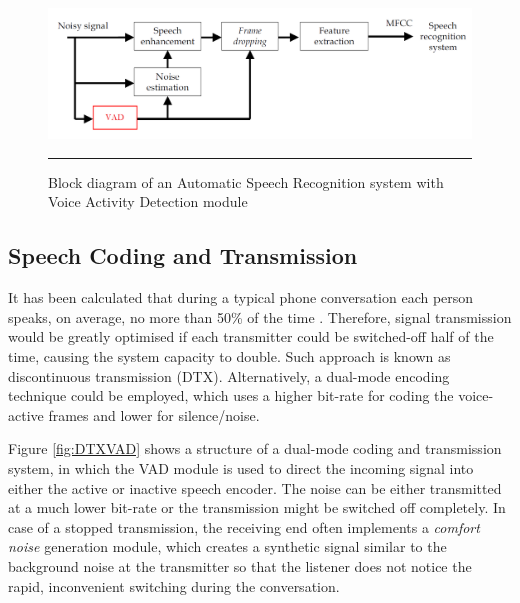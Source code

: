\begin{figure}[htbp]
	\centering
		\includegraphics[width=1\columnwidth]{Figures/ASRVAD.png}
		\rule{37em}{0.5pt}
	\caption[Automatic Speech Recognition system with Voice Activity Detection module]{Block diagram of an Automatic Speech Recognition system with Voice Activity Detection module \cite{RamirezGorriz}}
	\label{fig:ASRVAD}
\end{figure}

\subsection{Speech Coding and Transmission}

It has been calculated that during a typical phone conversation each person speaks, on average, no more than 50\% of the time \citep{GSMControl}. Therefore, signal transmission would be greatly optimised if each transmitter could be switched-off half of the time, causing the system capacity to double. Such approach is known as discontinuous transmission (DTX). Alternatively, a dual-mode encoding technique could be employed, which uses a higher bit-rate for coding the voice-active frames and lower for silence/noise.

Figure \ref{fig:DTXVAD} shows a structure of a dual-mode coding and transmission system, in which the VAD module is used to direct the incoming signal into either the active or inactive speech encoder. The noise can be either transmitted at a much lower bit-rate or the transmission might be switched off completely. In case of a stopped transmission, the receiving end often implements a \emph{comfort noise} \citep{GSMControl,RamirezGorriz} generation module, which creates a synthetic signal similar to the background noise at the transmitter so that the listener does not notice the rapid, inconvenient switching during the conversation.


